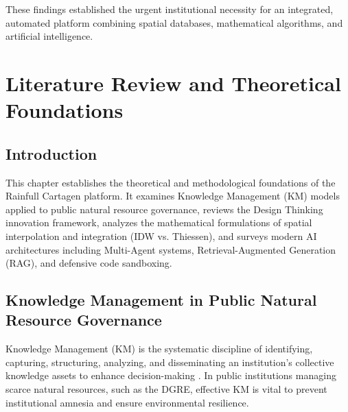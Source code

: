 \documentclass[12pt,a4paper]{report}
\begin{document}
These findings established the urgent institutional necessity for an integrated, automated platform combining spatial databases, mathematical algorithms, and artificial intelligence.

\newpage

\chapter{Literature Review and Theoretical Foundations}

\section{Introduction}

This chapter establishes the theoretical and methodological foundations of the Rainfull Cartagen platform. It examines Knowledge Management (KM) models applied to public natural resource governance, reviews the Design Thinking innovation framework, analyzes the mathematical formulations of spatial interpolation and integration (IDW vs. Thiessen), and surveys modern AI architectures including Multi-Agent systems, Retrieval-Augmented Generation (RAG), and defensive code sandboxing.

\section{Knowledge Management in Public Natural Resource Governance}

Knowledge Management (KM) is the systematic discipline of identifying, capturing, structuring, analyzing, and disseminating an institution's collective knowledge assets to enhance decision-making \cite{davenport1998, alavi2001}. In public institutions managing scarce natural resources, such as the DGRE, effective KM is vital to prevent institutional amnesia and ensure environmental resilience.
\end{document}

